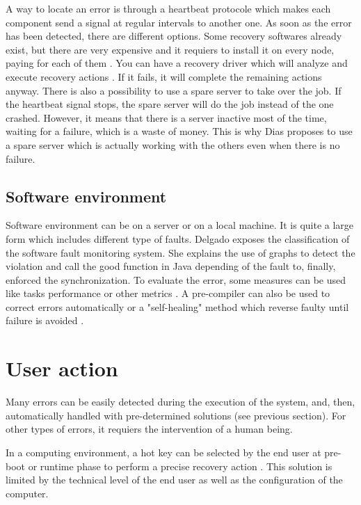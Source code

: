 \documentclass[10pt,a4paper]{report}
\begin{document}
A way to locate an error is through a heartbeat protocole \cite{TecReview1,TecReview2} which makes each component send a signal at regular intervals to another one. As soon as the error has been detected, there are different options. 
Some recovery softwares already exist, but there are very expensive and it requiers to install it on every node, paying for each of them \cite{TecReview1}.
You can have a recovery driver which will analyze and execute recovery actions \cite{TecReview1}. If it fails, it will complete the remaining actions anyway. 
There is also a possibility to use a spare server to take over the job. If the heartbeat signal stops, the spare server will do the job instead of the one crashed. However, it means that there is a server inactive most of the time, waiting for a failure, which is a waste of money. This is why Dias \cite{TecReview2} proposes to use a spare server which is actually working with the others even when there is no failure.

		\subsection{Software environment}
Software environment can be on a server or on a local machine. It is quite a large form which includes different type of faults. Delgado \cite{TecReview3} exposes the classification of the software fault monitoring system. She explains the use of graphs to detect the violation and call the good function in Java depending of the fault to, finally, enforced the synchronization. To evaluate the error, some measures can be used like tasks performance or other metrics \cite{TecReview4}. A pre-compiler can also be used to correct errors automatically \cite{TecReview5} or a "self-healing" method which reverse faulty until failure is avoided \cite{TecReview6}.
		
	\section{User action}	
Many errors can be easily detected during the execution of the system, and, then, automatically handled with pre-determined solutions (see previous section). For other types of errors, it requiers the intervention of a human being. 

In a computing environment, a hot key can be selected by the end user at pre-boot or runtime phase to perform a precise recovery action \cite{TecReview7}. This solution is limited by the technical level of the end user as well as the configuration of the computer. 
\end{document}
